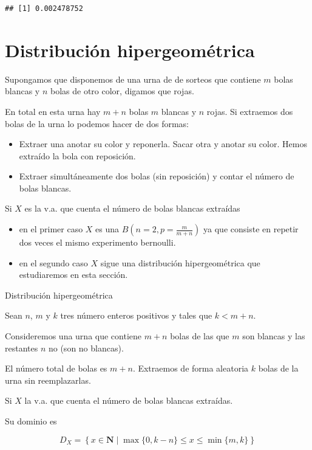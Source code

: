 \documentclass[]{book}
\providecommand{\tightlist}{%
  \setlength{\itemsep}{0pt}\setlength{\parskip}{0pt}}
\begin{document}
\begin{verbatim}
## [1] 0.002478752
\end{verbatim}

\hypertarget{distribuciuxf3n-hipergeomuxe9trica}{%
\section{Distribución hipergeométrica}\label{distribuciuxf3n-hipergeomuxe9trica}}

Supongamos que disponemos de una urna de de sorteos que contiene \(m\) bolas blancas y \(n\) bolas de otro color, digamos que rojas.

En total en esta urna hay \(m+n\) bolas \(m\) blancas y \(n\) rojas. Si extraemos dos bolas de la urna lo podemos hacer de dos formas:

\begin{itemize}
\tightlist
\item
  Extraer una anotar su color y reponerla. Sacar otra y anotar su color. Hemos extraído la bola con reposición.
\item
  Extraer simultáneamente dos bolas (sin reposición) y contar el número de bolas blancas.
\end{itemize}

Si \(X\) es la v.a. que cuenta el número de bolas blancas extraídas

\begin{itemize}
\tightlist
\item
  en el primer caso \(X\) es una \(B(n=2,p=\frac{m}{m+n})\) ya que consiste en repetir dos veces el mismo experimento bernoulli.
\item
  en el segundo caso \(X\) sigue una distribución hipergeométrica que estudiaremos en esta sección.
\end{itemize}

 Distribución hipergeométrica

Sean \(n\), \(m\) y \(k\) tres número enteros positivos y tales que \(k<m+n\).

Consideremos una urna que contiene \(m+n\) bolas de las que \(m\) son blancas y las restantes \(n\) no (son no blancas).

El número total de bolas es \(m+n\). Extraemos de forma aleatoria \(k\) bolas de la urna sin reemplazarlas.

Si \(X\) la v.a. que cuenta el número de bolas blancas extraídas.

Su dominio es

\[D_X=\left\{x\in\mathbf{N}\mid \max\{0,k-n\}\leq  x \leq \min\{m,k\}\right\}\]
\end{document}
